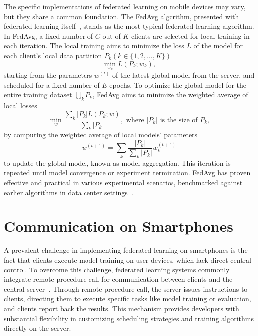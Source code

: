 The specific implementations of federated learning on mobile devices may vary,
but they share a common foundation. The FedAvg algorithm,
presented with federated learning itself~\cite{mcmahan2017communication},
stands as the most typical federated learning algorithm. In FedAvg,
a fixed number of $C$ out of $K$ clients are selected for local training in each
iteration.
The local training aims to minimize the loss $L$ of the model for each client's
local data partition $P_k (k \in \{1, 2, \dots, K\})$:
\begin{equation}
    \min_{w_k} L(P_k;w_k),
\end{equation}
starting from the parameters $w^{(t)}$ of the latest global model from the
server, and scheduled for a fixed number of $E$ epochs.
To optimize the global model for the entire training dataset $\bigcup_k P_k$,
FedAvg aims to minimize the weighted average of local losses
\begin{equation}
    \min_{w} \frac{\sum_k |P_k|L(P_k;w)}{\sum_k |P_k|},
    \text{ where }|P_k|\text{ is the size of }P_k,
\end{equation}
by computing the weighted average of local models' parameters
\begin{equation}
    \label{eq:aggregation}
    w^{(t+1)}=\sum_k \frac{|P_k|}{\sum_k |P_k|}w_k^{(t+1)}
\end{equation}
to update the global model, known as model aggregation.
This iteration is repeated until model convergence or experiment termination.
FedAvg has proven effective and practical in various experimental scenarios,
benchmarked against earlier algorithms in data center
settings~\cite{bonawitz2019towards}.

\section{Communication on Smartphones}

A prevalent challenge in implementing federated learning on smartphones is the
fact that clients execute model training on user devices,
which lack direct central control. To overcome this challenge,
federated learning systems commonly integrate remote procedure call
for communication between clients and the central
server~\cite{tff,he2020fedml,beutel2020flower,patrick2022openfl,madrigal2023project}.
Through remote procedure call, the server issues instructions to clients,
directing them to execute specific tasks like model training or evaluation,
and clients report back the results.
This mechanism provides developers with substantial flexibility in customizing
scheduling strategies and training algorithms directly on the server.

